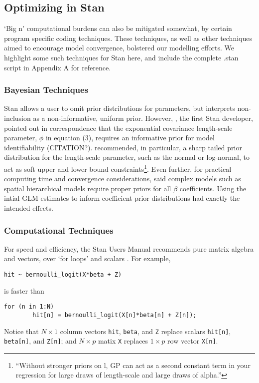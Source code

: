 \subsection{Optimizing in Stan} %
`Big n' computational burdens can also be mitigated somewhat, by certain program specific coding techniques. These techniques, as well as other techniques aimed to encourage model convergence, bolstered our modelling efforts. We highlight some such techniques for Stan here, and include the complete .stan script in Appendix A for reference. 

\subsubsection{Bayesian Techniques} %

Stan allows a user to omit prior distributions for parameters, but interprets non-inclusion as a non-informative, uniform prior. However, \cite{Gelman}, the first Stan developer, pointed out in correspondence that the exponential covariance length-scale parameter, $\phi$ in equation (3), requires an informative prior for model identifiability (CITATION?). \cite{Trangucci} recommended, in particular, a sharp tailed prior distribution for the length-scale parameter, such as the normal or log-normal, to act as soft upper and lower bound constraints\footnote{``Without stronger priors on l, GP can act as a second constant term in your regression for large draws of length-scale and large draws of alpha.''}. Even further, for practical computing time and convergence considerations, \cite{Trangucci} said complex models such as spatial hierarchical models require proper priors for all $\beta$ coefficients. Using the intial GLM estimates to inform coefficient prior distributions had exactly the intended effects.

\subsubsection{Computational Techniques} %
For speed and efficiency, the Stan Users Manual recommends pure matrix algebra and vectors, over `for loops' and scalars \cite{STANtheMan}. For example, 
\begin{verbatim}
hit ~ bernoulli_logit(X*beta + Z)
\end{verbatim}
is faster than
\begin{verbatim}
for (n in 1:N)
        hit[n] = bernoulli_logit(X[n]*beta[n] + Z[n]);
\end{verbatim}
Notice that $N \times 1$ column vectors \verb|hit|, \verb|beta|, and \verb|Z| replace scalars \verb|hit[n]|, \verb|beta[n]|, and \verb|Z[n]|; and $N \times p$ matix \verb|X| replaces $1 \times p$ row vector \verb|X[n]|.

